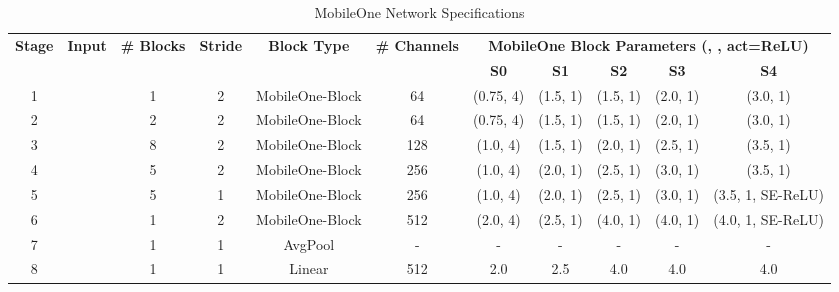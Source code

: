 \begin{table*}
\footnotesize
\begin{tabular}{ccccccccccc}
          \toprule
          \multirow{2}{*}{\textbf{Stage}} & \multirow{2}{*}{\textbf{Input}} & \multirow{2}{*}{\textbf{\# Blocks}} & \multirow{2}{*}{\textbf{Stride}} & \multirow{2}{*}{\textbf{Block Type}} &
          \multirow{2}{*}{\textbf{\# Channels}} & \multicolumn{5}{c}{\textbf{MobileOne Block Parameters (, , act=ReLU)}} \\
          \cmidrule{7-11}
          & & & & & & \textbf{S0} & \textbf{S1} & \textbf{S2} & \textbf{S3} & \textbf{S4} \\
          \midrule
          1  &  & 1 & 2 & MobileOne-Block & 64  & (0.75, 4) & (1.5, 1) & (1.5, 1) & (2.0, 1) & (3.0, 1) \\
          2  &  & 2 & 2 & MobileOne-Block & 64  & (0.75, 4) & (1.5, 1) & (1.5, 1) & (2.0, 1) & (3.0, 1)\\
          3  &    & 8 & 2 & MobileOne-Block & 128 & (1.0, 4)  & (1.5, 1) & (2.0, 1) & (2.5, 1) & (3.5, 1) \\
          4  &    & 5 & 2 & MobileOne-Block & 256 & (1.0, 4)  & (2.0, 1) & (2.5, 1) & (3.0, 1) & (3.5, 1) \\
          5  &    & 5 & 1 & MobileOne-Block & 256 & (1.0, 4)  & (2.0, 1) & (2.5, 1) & (3.0, 1) & (3.5, 1, SE-ReLU) \\
          6  &    & 1 & 2 & MobileOne-Block & 512 & (2.0, 4)  & (2.5, 1) & (4.0, 1) & (4.0, 1) & (4.0, 1, SE-ReLU) \\
          7  &      & 1 & 1 & AvgPool & - & - & - & - & - & - \\
          8  &      & 1 & 1 & Linear & 512 & 2.0 & 2.5 & 4.0 & 4.0 & 4.0 \\
          \midrule
        \end{tabular}
\vspace{-0.2cm}
    \caption{MobileOne Network Specifications}
    \label{table:mobileone_network_specification}
    \vspace{-0.2cm}
\end{table*}


 
  



